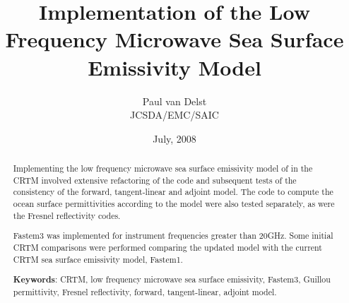 



\newcommand{\de}{\ensuremath{\delta\epsilon}}
\newcommand{\es}{\ensuremath{\epsilon_{s}}}
\newcommand{\einf}{\ensuremath{\epsilon_{\infty}}}
\newcommand{\eo}{\ensuremath{\epsilon_{0}}}
\newcommand{\twopnt}{\ensuremath{2\pi\nu\tau}}
\newcommand{\dstar}{\ensuremath{\delta^{*}\!}}

\title{Implementation of the Low Frequency Microwave Sea Surface Emissivity Model}
\author{Paul van Delst\\JCSDA/EMC/SAIC}
\date{July, 2008}



\maketitle


\begin{abstract}
Implementing the low frequency microwave sea surface emissivity model of \citet{Kazumori_2008} in the CRTM involved extensive refactoring of the code and subsequent tests of the consistency of the forward, tangent-linear and adjoint model. The code to compute the ocean surface permittivities according to the \citet{Guillou_1998} model were also tested separately, as were the Fresnel reflectivity codes.

Fastem3 was implemented for instrument frequencies greater than 20GHz. Some initial CRTM comparisons were performed comparing the updated model with the current CRTM sea surface emissivity model, Fastem1.

\textbf{Keywords}: CRTM, low frequency microwave sea surface emissivity, Fastem3, Guillou permittivity, Fresnel reflectivity, forward, tangent-linear, adjoint model.
\end{abstract}













	


\begin{appendix}
  
  
\end{appendix}



